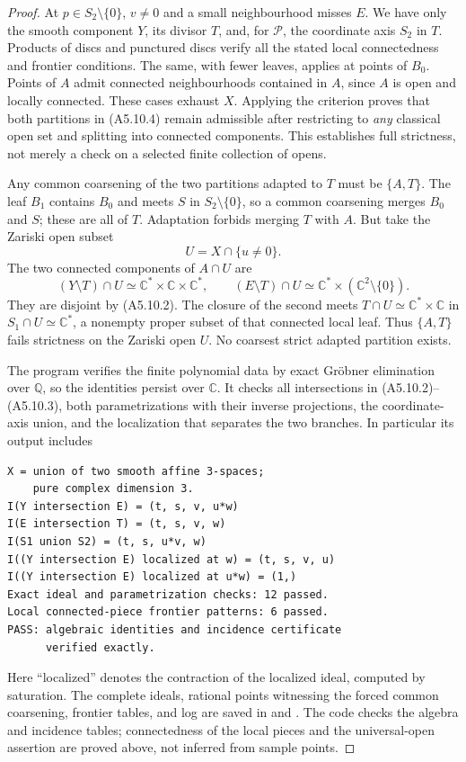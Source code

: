 \begin{proof}
At $p\in S_2\setminus\{0\}$, $v\ne0$ and a small neighbourhood
misses $E$.  We have only the smooth component $Y$, its divisor
$T$, and, for $\mathcal P$, the coordinate axis $S_2$ in $T$.
Products of discs and punctured discs verify all the stated local
connectedness and frontier conditions.  The same, with fewer
leaves, applies at points of $B_0$.  Points of $A$ admit connected
neighbourhoods contained in $A$, since $A$ is open and locally
connected.  These cases exhaust $X$.  Applying the criterion proves
that both partitions in (A5.10.4) remain admissible after restricting
to \emph{any} classical open set and splitting into connected
components.  This establishes full strictness, not merely a check
on a selected finite collection of opens.

Any common coarsening of the two partitions adapted to $T$ must
be $\{A,T\}$.  The leaf $B_1$ contains $B_0$ and meets $S$ in
$S_2\setminus\{0\}$, so a common coarsening merges $B_0$ and $S$;
these are all of $T$.  Adaptation forbids merging $T$ with $A$.
But take the Zariski open subset
\[
                         U=X\cap\{u\ne0\}.
\]
The two connected components of $A\cap U$ are
\[
 (Y\setminus T)\cap U\simeq\mathbb C^*\times\mathbb C\times\mathbb C^*,
 \qquad
 (E\setminus T)\cap U\simeq
       \mathbb C^*\times(\mathbb C^2\setminus\{0\}).
\]
They are disjoint by (A5.10.2).  The closure of the second meets
$T\cap U\simeq\mathbb C^*\times\mathbb C$ in
$S_1\cap U\simeq\mathbb C^*$, a nonempty proper subset of that
connected local leaf.  Thus $\{A,T\}$ fails strictness on the
Zariski open $U$.  No coarsest strict adapted partition exists.

The program 
verifies the finite polynomial data by exact Gr\"obner elimination
over $\mathbb Q$, so the identities persist over $\mathbb C$.
It checks all intersections in (A5.10.2)--(A5.10.3), both
parametrizations with their inverse projections, the coordinate-axis
union, and the localization that separates the two branches.  In
particular its output includes
\begin{verbatim}
X = union of two smooth affine 3-spaces;
    pure complex dimension 3.
I(Y intersection E) = (t, s, v, u*w)
I(E intersection T) = (t, s, v, w)
I(S1 union S2) = (t, s, u*v, w)
I((Y intersection E) localized at w) = (t, s, v, u)
I((Y intersection E) localized at u*w) = (1,)
Exact ideal and parametrization checks: 12 passed.
Local connected-piece frontier patterns: 6 passed.
PASS: algebraic identities and incidence certificate
      verified exactly.
\end{verbatim}
Here ``localized'' denotes the contraction of the localized ideal,
computed by saturation.  The complete ideals, rational points
witnessing the forced common coarsening, frontier tables, and log
are saved in 
and .
The code checks the algebra and incidence tables; connectedness of
the local pieces and the universal-open assertion are proved above,
not inferred from sample points.
\end{proof}

